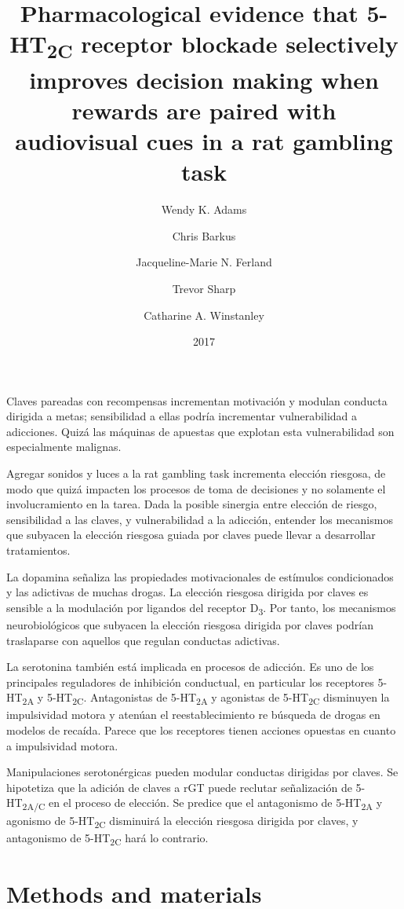 \documentclass[a4paper,12pt]{article}
\title{Pharmacological evidence that 5-HT\textsubscript{2C} receptor blockade selectively improves decision making when rewards are paired with audiovisual cues in a rat gambling task}
\author{Wendy K. Adams \and Chris Barkus \and Jacqueline-Marie N. Ferland \and Trevor Sharp \and Catharine A. Winstanley}
\date{2017}
\begin{document}
{\scshape\bfseries \maketitle}

Claves pareadas con recompensas incrementan motivación y modulan conducta dirigida a metas; sensibilidad a ellas podría incrementar vulnerabilidad a adicciones. Quizá las máquinas de apuestas que explotan esta vulnerabilidad son especialmente malignas.

Agregar sonidos y luces a la rat gambling task incrementa elección riesgosa, de modo que quizá impacten los procesos de toma de decisiones y no solamente el involucramiento en la tarea. Dada la posible sinergia entre elección de riesgo, sensibilidad a las claves, y vulnerabilidad a la adicción, entender los mecanismos que subyacen la elección riesgosa guiada por claves puede llevar a desarrollar tratamientos.

La dopamina señaliza las propiedades motivacionales de estímulos condicionados y las adictivas de muchas drogas. La elección riesgosa dirigida por claves es sensible a la modulación por ligandos del receptor D\textsubscript{3}. Por tanto, los mecanismos neurobiológicos que subyacen la elección riesgosa dirigida por claves podrían traslaparse con aquellos que regulan conductas adictivas.

La serotonina también está implicada en procesos de adicción. Es uno de los principales reguladores de inhibición conductual, en particular los receptores 5-HT\textsubscript{2A} y 5-HT\textsubscript{2C}. Antagonistas de 5-HT\textsubscript{2A} y agonistas de 5-HT\textsubscript{2C} disminuyen la impulsividad motora y atenúan el reestablecimiento re búsqueda de drogas en modelos de recaída. Parece que los receptores tienen acciones opuestas en cuanto a impulsividad motora.

Manipulaciones serotonérgicas pueden modular conductas dirigidas por claves. Se hipotetiza que la adición de claves a rGT puede reclutar señalización de 5-HT\textsubscript{2A/C} en el proceso de elección. Se predice que el antagonismo de 5-HT\textsubscript{2A} y agonismo de 5-HT\textsubscript{2C} disminuirá la elección riesgosa dirigida por claves, y antagonismo de 5-HT\textsubscript{2C} hará lo contrario.

\section{Methods and materials}
\end{document}
